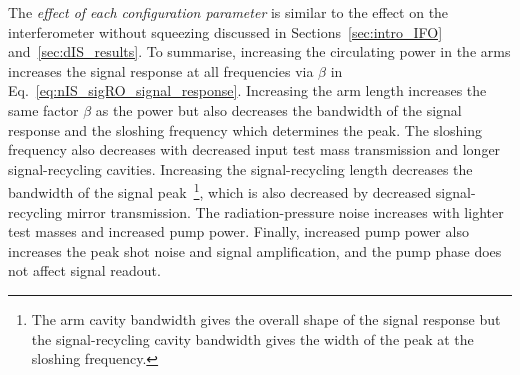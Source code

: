 The \emph{effect of each configuration parameter} is similar to the effect on the interferometer without squeezing discussed in Sections~\ref{sec:intro_IFO} and~\ref{sec:dIS_results}. To summarise, increasing the circulating power in the arms increases the signal response at all frequencies via $\beta$ in Eq.~\ref{eq:nIS_sigRO_signal_response}. Increasing the arm length increases the same factor $\beta$ as the power but also decreases the bandwidth of the signal response and the sloshing frequency which determines the peak. The sloshing frequency also decreases with decreased input test mass transmission and longer signal-recycling cavities. Increasing the signal-recycling length decreases the bandwidth of the signal peak~\footnote{The arm cavity bandwidth gives the overall shape of the signal response but the signal-recycling cavity bandwidth gives the width of the peak at the sloshing frequency.}, which is also decreased by decreased signal-recycling mirror transmission. The radiation-pressure noise increases with lighter test masses and increased pump power. Finally, increased pump power also increases the peak shot noise and signal amplification, and the pump phase does not affect signal readout.


\label{sec:nOPO_reduction}



